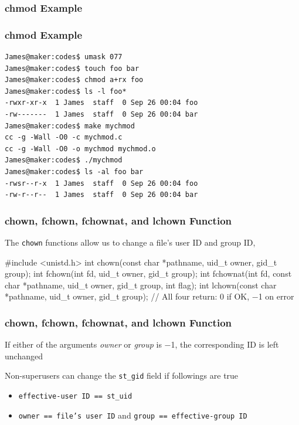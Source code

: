 \documentclass[newPxFont,sthlmFooter,nooffset]{beamer}
\begin{document}
\begin{frame}[containsverbatim,t]
  \frametitle{chmod Example}

\end{frame}

\begin{frame}
  \frametitle{chmod Example}
\begin{verbatim}
James@maker:codes$ umask 077
James@maker:codes$ touch foo bar
James@maker:codes$ chmod a+rx foo
James@maker:codes$ ls -l foo*
-rwxr-xr-x  1 James  staff  0 Sep 26 00:04 foo
-rw-------  1 James  staff  0 Sep 26 00:04 bar
James@maker:codes$ make mychmod
cc -g -Wall -O0 -c mychmod.c
cc -g -Wall -O0 -o mychmod mychmod.o
James@maker:codes$ ./mychmod
James@maker:codes$ ls -al foo bar
-rwsr--r-x  1 James  staff  0 Sep 26 00:04 foo
-rw-r--r--  1 James  staff  0 Sep 26 00:04 bar
\end{verbatim}
\end{frame}


\begin{frame}[containsverbatim,t]
  \frametitle{chown, fchown, fchownat, and lchown Function}
The \texttt{chown} functions allow us to change a file’s user ID and group ID, 

\bigskip
\begin{codedef}
#include <unistd.h>
int chown(const char *pathname, uid_t owner, gid_t group);
int fchown(int fd, uid_t owner, gid_t group);
int fchownat(int fd, const char *pathname, uid_t owner, gid_t group, int flag);
int lchown(const char *pathname, uid_t owner, gid_t group);
// All four return: 0 if OK, −1 on error
\end{codedef}
\end{frame}


\begin{frame}[t]
  \frametitle{chown, fchown, fchownat, and lchown Function}
If either of the arguments \textit{owner} or \textit{group} is −1, the corresponding ID is left unchanged

\bigskip
Non-superusers can change the \texttt{st\_gid} field if followings are true
\begin{itemize}
\item \texttt{effective-user ID == st\_uid}
\item \texttt{owner == file's user ID} and \texttt{group == effective-group ID}
\end{itemize}
\end{frame}
\end{document}
